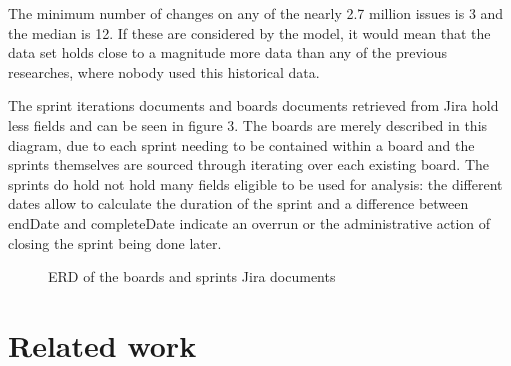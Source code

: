 \documentclass[sigconf]{acmart}
\begin{document}
The minimum number of changes on any of the nearly 2.7 million issues is 3 and the median is 12. If these are considered by the model, it would mean that the data set holds close to a magnitude more data than any of the previous researches, where nobody used this historical data.

The sprint iterations documents and boards documents retrieved from Jira hold less fields and can be seen in figure 3.
The boards are merely described in this diagram, due to each sprint needing to be contained within a board and the sprints themselves are sourced through iterating over each existing board.
The sprints do hold not hold many fields eligible to be used for analysis: the different dates allow to calculate the duration of the sprint and a difference between endDate and completeDate indicate an overrun or the administrative action of closing the sprint being done later.

\begin{figure}
\caption{ERD of the boards and sprints Jira documents}
\begin{center}
\end{center}
\end{figure}


\section{Related work} 
\end{document}
